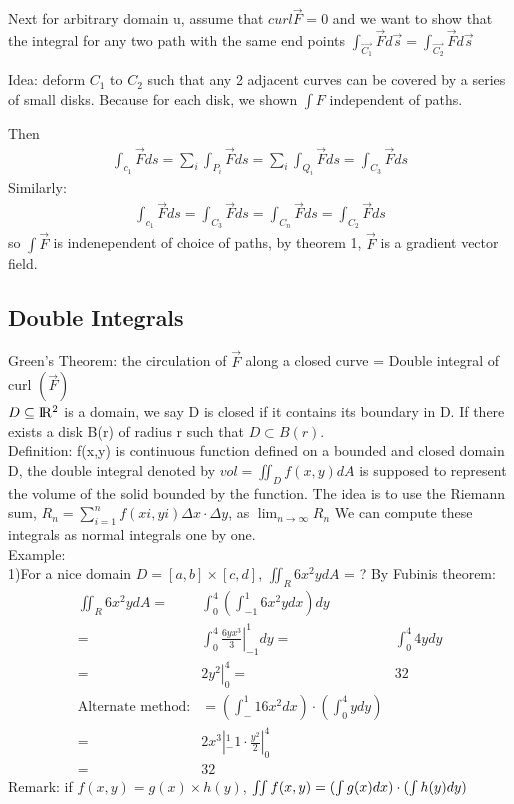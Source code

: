 \documentclass{article}
\newcommand{\R}{\rm I\!R}
\begin{document}
        Next for arbitrary domain u, assume that $curl\vec{F} = 0$ and we want to show that the integral for any two path with the same end points $\int_{\vec{C_1}}\vec{F}d\vec{s} = \int_{\vec{C_2}}\vec{F}d\vec{s}$
        
        Idea: deform $C_1$ to $C_2$ such that any 2 adjacent curves can be covered by a series of small disks. Because for each disk, we shown $\int F$ independent of paths.
        
        Then
        \begin{align}
            \int_{c_1}\vec{F}ds = \sum_i \int_{P_i}\vec{F}ds = \sum_i \int_{Q_i}\vec{F}ds =  \int_{C_3}\vec{F}ds
        \end{align}
        Similarly: 
        \begin{align}
            \int_{c_1}\vec{F}ds = \int_{C_3}\vec{F}ds = \int_{C_n}\vec{F}ds =  \int_{C_2}\vec{F}ds
        \end{align}
        so $\int\vec{F}$ is indenependent of choice of paths, by theorem 1, $\vec{F}$ is a gradient vector field.
    \subsection{Double Integrals}
        Green's Theorem: the circulation of $\vec{F}$ along a closed curve = Double integral of curl $(\vec{F})$\\
        
        $D\subseteq \R^2$ is a domain, we say D is closed if it contains its boundary in D. If there exists a disk B(r) of radius r such that $D \subset B(r)$.\\
        
        Definition: f(x,y) is continuous function defined on a bounded and closed domain D, the double integral denoted by $vol =\iint_D f(x,y) dA$ is supposed to represent the volume of the solid bounded by the function. The idea is to use the Riemann sum, $R_n = \sum^n_{i=1}f(xi,yi)\Delta x\cdot\Delta y$, as $\lim_{n\rightarrow \infty} R_n$ We can compute these integrals as normal integrals one by one.\\
        
        Example: \\1)For a nice domain $D = [a,b]\times[c,d]$, $\iint_R 6x^2 y dA$ = ? By Fubinis theorem:
        \begin{align}
            \iint_R 6x^2 y dA =& \int^4_0 \left(\int^1_{-1} 6x^2ydx \right) dy\\
            =&\int^4_0 \left.\frac{6yx^3}{3}\right|^1_{-1} dy
            =&\int^4_0 4y dy\\
            =& \left.2y^2\right|^4_0
            =& 32\\
            \text{Alternate method:} &= \left(\int^1_-1 6x^2 dx\right)\cdot\left(\int^4_0 y dy \right)\\
            =& 2x^3|^1_-1 \cdot \frac{y^2}{2}|^4_0\\
            =& 32
        \end{align}
        Remark: if $f(x,y)=g(x)\times h(y)$, $\iint f(x,y)=(\int g(x)dx)\cdot(\int h(y)dy)\\$
        
\end{document}
